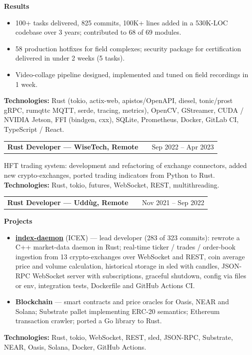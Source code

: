 \documentclass[a4paper,11pt]{article}
\makeatletter
\newenvironment{jobshort}[2]
    {
    \begin{tabularx}{\linewidth}{@{}l X r@{}}
    \textbf{#1} & \hfill &  #2 \\[3.75pt]
    \end{tabularx}
    }
    {
    }
\newcommand{\jobpart}[1]{\vspace{4pt}\textbf{#1}\vspace{1pt}}
\newenvironment{joblist}
    {\begin{itemize}[nosep, leftmargin=1em, itemsep=2pt, label=--]}
    {\end{itemize}}
\makeatother
\begin{document}
\jobpart{Results}
\begin{joblist}
\item 100+ tasks delivered, 825 commits, 100K+ lines added in a 530K-LOC codebase over 3 years; contributed to 68 of 69 modules.
\item 58 production hotfixes for field complexes; security package for certification delivered in under 2 weeks (5 tasks).
\item Video-collage pipeline designed, implemented and tuned on field recordings in 1 week.
\end{joblist}

\jobpart{Technologies:}
Rust (tokio, actix-web, apistos/OpenAPI, diesel, tonic/prost gRPC, rumqttc MQTT, serde, tracing, metrics), OpenCV, GStreamer, CUDA / NVIDIA Jetson, FFI (bindgen, cxx), SQLite, Prometheus, Docker, GitLab CI, TypeScript / React.

\vspace{6pt}
\begin{jobshort}{Rust Developer --- WiseTech, Remote}{Sep 2022 -- Apr 2023}
HFT trading system: development and refactoring of exchange connectors, added new crypto-exchanges, ported trading indicators from Python to Rust.
\textbf{Technologies:} Rust, tokio, futures, WebSocket, REST, multithreading.
\end{jobshort}

\vspace{6pt}
\begin{jobshort}{Rust Developer --- Udd\`ug, Remote}{Nov 2021 -- Sep 2022}
\end{jobshort}
\jobpart{Projects}
\begin{joblist}
\item \textbf{\href{https://github.com/uddugteam/index-daemon}{index-daemon}} (ICEX) --- lead developer (283 of 323 commits): rewrote a C++ market-data daemon in Rust; real-time ticker / trades / order-book ingestion from 13 crypto-exchanges over WebSocket and REST, coin average price and volume calculation, historical storage in sled with candles, JSON-RPC WebSocket server with subscriptions, graceful shutdown, config via files or env, integration tests, Dockerfile and GitHub Actions CI.
\item \textbf{Blockchain} --- smart contracts and price oracles for Oasis, NEAR and Solana; Substrate pallet implementing ERC-20 semantics; Ethereum transaction crawler; ported a Go library to Rust.
\end{joblist}
\jobpart{Technologies:}
Rust, tokio, WebSocket, REST, sled, JSON-RPC, Substrate, NEAR, Oasis, Solana, Docker, GitHub Actions.
\end{document}
